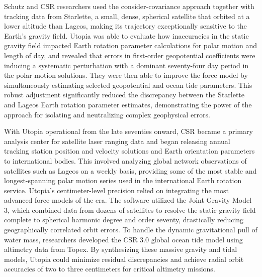 Schutz and CSR researchers used the consider-covariance approach together with tracking data from Starlette, a small, dense, spherical satellite that orbited at a lower altitude than Lageos, making its trajectory exceptionally sensitive to the Earth’s gravity field. Utopia was able to evaluate how inaccuracies in the static gravity field impacted Earth rotation parameter calculations for polar motion and length of day, and revealed that errors in first-order geopotential coefficients were inducing a systematic perturbation with a dominant seventy-four day period in the polar motion solutions. They were then able to improve the force model by simultaneously estimating selected geopotential and ocean tide parameters. This robust adjustment significantly reduced the discrepancy between the Starlette and Lageos Earth rotation parameter estimates, demonstrating the power of the approach for isolating and neutralizing complex geophysical errors.

With Utopia operational from the late seventies onward, CSR became a primary analysis center for satellite laser ranging data and began releasing annual tracking station position and velocity solutions and Earth orientation parameters to international bodies. This involved analyzing global network observations of satellites such as Lageos on a weekly basis, providing some of the most stable and longest-spanning polar motion series used in the international Earth rotation service. Utopia's centimeter-level precision relied on integrating the most advanced force models of the era. The software utilized the Joint Gravity Model 3, which combined data from dozens of satellites to resolve the static gravity field complete to spherical harmonic degree and order seventy, drastically reducing geographically correlated orbit errors. To handle the dynamic gravitational pull of water mass, researchers developed the CSR 3.0 global ocean tide model using altimetry data from Topex. By synthesizing these massive gravity and tidal models, Utopia could minimize residual discrepancies and achieve radial orbit accuracies of two to three centimeters for critical altimetry missions.

